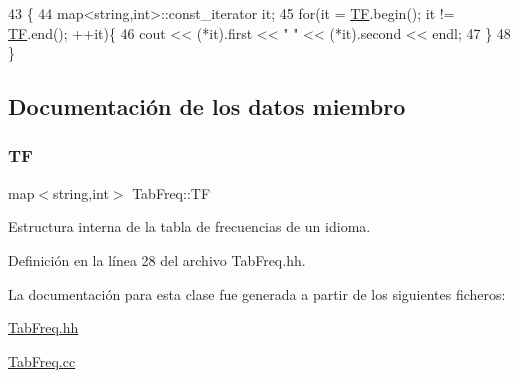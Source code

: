 \begin{DoxyCode}
43                              \{
44   map<string,int>::const\_iterator it;
45   \textcolor{keywordflow}{for}(it = \hyperlink{class_tab_freq_ae6be9a9671af1d897960648e10a62cfb}{TF}.begin(); it != \hyperlink{class_tab_freq_ae6be9a9671af1d897960648e10a62cfb}{TF}.end(); ++it)\{
46       cout << (*it).first << \textcolor{stringliteral}{" "} << (*it).second << endl;
47   \}
48 \}
\end{DoxyCode}


\subsection{Documentación de los datos miembro}
\mbox{\label{class_tab_freq_ae6be9a9671af1d897960648e10a62cfb}} 
\subsubsection{\texorpdfstring{TF}{TF}}
{\footnotesize\ttfamily map$<$string,int$>$ Tab\+Freq\+::\+TF\hspace{0.3cm}{\ttfamily [private]}}



Estructura interna de la tabla de frecuencias de un idioma. 



Definición en la línea 28 del archivo Tab\+Freq.\+hh.



La documentación para esta clase fue generada a partir de los siguientes ficheros\+:\begin{DoxyCompactItemize}
\item 
\hyperlink{_tab_freq_8hh}{Tab\+Freq.\+hh}\item 
\hyperlink{_tab_freq_8cc}{Tab\+Freq.\+cc}\end{DoxyCompactItemize}

